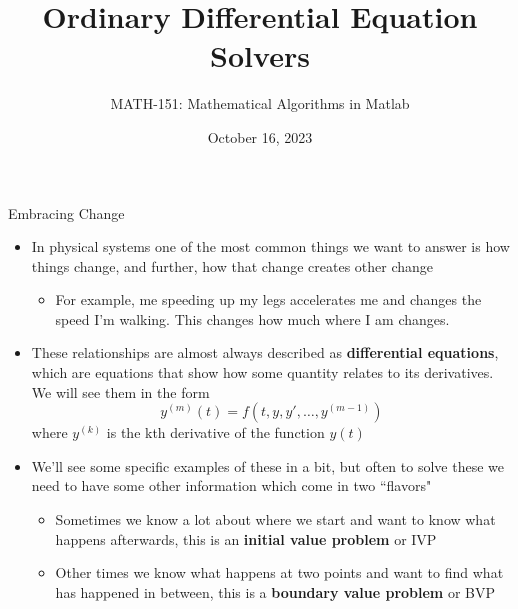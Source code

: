 {}\documentclass[letterpaper,
compress,
xcolor=x11names,
]{beamer}
\begin{document}
	\title{Ordinary Differential Equation Solvers}
	\author{MATH-151:  Mathematical Algorithms in Matlab}
	\date[202X]{October 16, 2023}




\begin{frame}
\titlepage
\end{frame}


\begin{frame}{Embracing Change}
	\footnotesize
	\begin{itemize}
		\item In physical systems one of the most common things we want to answer is how things change, and further, how that change creates other change
		\begin{itemize}
			\item For example, me speeding up my legs accelerates me and changes the speed I'm walking. This changes how much where I am changes.
		\end{itemize}
		\item<2-> These relationships are almost always described as \textbf{differential equations}, which are equations that show how some quantity relates to its derivatives. We will see them in the form 
		\begin{equation*}
			y^{(m)}(t) = f(t,y,y',\dots,y^{(m-1)})
		\end{equation*}
		where $y^{(k)}$ is the kth derivative of the function $y(t)$
		\item<3-> We'll see some specific examples of these in a bit, but often to solve these we need to have some other information which come in two ``flavors"
		\begin{itemize}
			\item<4-> Sometimes we know a lot about where we start and want to know what happens afterwards, this is an \textbf{initial value problem} or IVP
			\item<5-> Other times we know what happens at two points and want to find what has happened in between, this is a \textbf{boundary value problem} or BVP
		\end{itemize}
	\end{itemize}
\end{frame}
\end{document}
